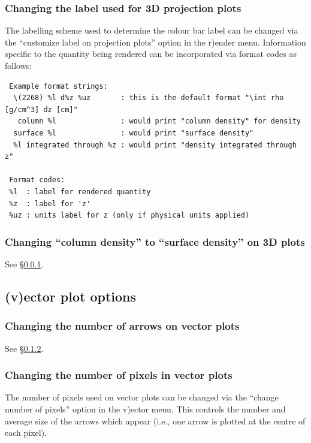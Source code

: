 \documentclass[a4paper,10pt]{article}
\begin{document}
\subsubsection{ Changing the label used for 3D projection plots}
\label{sec:setprojlabel}
The labelling scheme used to determine the colour bar label can be changed via the ``customize label on projection plots'' option in the r)ender menu. Information specific to the quantity being rendered can be incorporated via format codes as follows:
\begin{verbatim}
 Example format strings: 
  \(2268) %l d%z %uz       : this is the default format "\int rho [g/cm^3] dz [cm]"
   column %l               : would print "column density" for density
  surface %l               : would print "surface density"
  %l integrated through %z : would print "density integrated through z"

 Format codes: 
 %l  : label for rendered quantity 
 %z  : label for 'z' 
 %uz : units label for z (only if physical units applied)
\end{verbatim}


\subsubsection{ Changing ``column density'' to ``surface density'' on 3D plots}
See \S\ref{sec:setprojlabel}.

\subsection{(v)ector plot options}%
\label{sec:vectorplots}

\subsubsection{ Changing the number of arrows on vector plots}
 See \S\ref{sec:vecpix}.

\subsubsection{ Changing the number of pixels in vector plots}
\label{sec:vecpix}
 The number of pixels used on vector plots can be changed via the ``change number of pixels'' option in the v)ector menu. This controls the number and average size of the arrows which appear (i.e., one arrow is plotted at the centre of each pixel).
\end{document}
